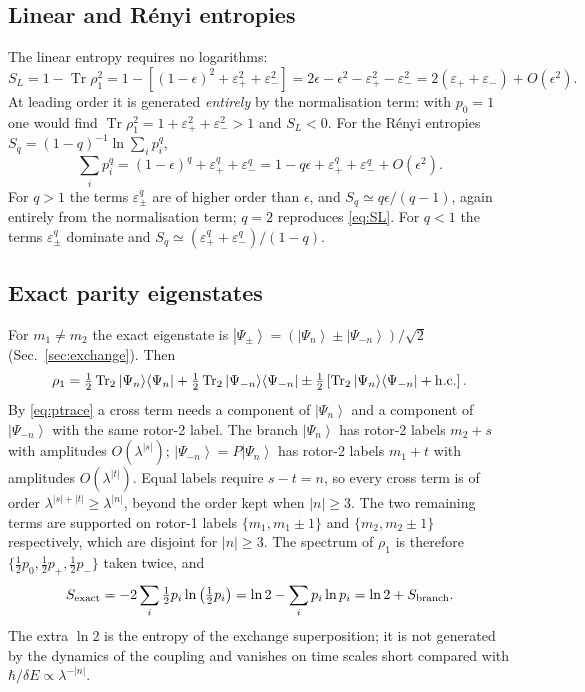 \documentclass[preprint,12pt]{elsarticle}
\newcommand{\Tr}{\operatorname{Tr}}
\newcommand{\ket}[1]{\left|#1\right\rangle}
\newcommand{\ketbra}[2]{\left|#1\right\rangle\!\left\langle#2\right|}
\newcommand{\epsp}{\varepsilon_{+}}
\newcommand{\epsm}{\varepsilon_{-}}
\begin{document}
\subsection{Linear and R\'enyi entropies}

The linear entropy requires no logarithms:
\begin{equation}
S_{L}=1-\Tr\rho_{1}^{2}=1-\left[(1-\epsilon)^{2}+\epsp^{2}+\epsm^{2}\right]
=2\epsilon-\epsilon^{2}-\epsp^{2}-\epsm^{2}=2\left(\epsp+\epsm\right)+O(\epsilon^{2}).
\label{eq:SL}
\end{equation}
At leading order it is generated \emph{entirely} by the normalisation term: with
$p_{0}=1$ one would find $\Tr\rho_{1}^{2}=1+\epsp^{2}+\epsm^{2}>1$ and
$S_{L}<0$. For the R\'enyi entropies
$S_{q}=(1-q)^{-1}\ln\sum_{i}p_{i}^{q}$,
\begin{equation}
\sum_{i}p_{i}^{q}=(1-\epsilon)^{q}+\epsp^{q}+\epsm^{q}
=1-q\epsilon+\epsp^{q}+\epsm^{q}+O(\epsilon^{2}).
\end{equation}
For $q>1$ the terms $\varepsilon_{\pm}^{q}$ are of higher order than $\epsilon$,
and $S_{q}\simeq q\epsilon/(q-1)$, again entirely from the normalisation
term; $q=2$ reproduces \eqref{eq:SL}. For $q<1$ the terms
$\varepsilon_{\pm}^{q}$ dominate and $S_{q}\simeq(\epsp^{q}+\epsm^{q})/(1-q)$.

\subsection{Exact parity eigenstates}
\label{sec:ln2}

For $m_{1}\neq m_{2}$ the exact eigenstate is
$\ket{\Psi_{\pm}}=(\ket{\Psi_{n}}\pm\ket{\Psi_{-n}})/\sqrt2$
(Sec.~\ref{sec:exchange}). Then
\begin{equation}
\rho_{1}=\tfrac12\Tr_{2}\ketbra{\Psi_{n}}{\Psi_{n}}
+\tfrac12\Tr_{2}\ketbra{\Psi_{-n}}{\Psi_{-n}}
\pm\tfrac12\left[\Tr_{2}\ketbra{\Psi_{n}}{\Psi_{-n}}+{\rm h.c.}\right].
\end{equation}
By \eqref{eq:ptrace} a cross term needs a component of $\ket{\Psi_{n}}$ and a
component of $\ket{\Psi_{-n}}$ with the same rotor-2 label. The branch
$\ket{\Psi_{n}}$ has rotor-2 labels $m_{2}+s$ with amplitudes $O(\lambda^{|s|})$;
$\ket{\Psi_{-n}}=P\ket{\Psi_{n}}$ has rotor-2 labels $m_{1}+t$ with amplitudes
$O(\lambda^{|t|})$. Equal labels require $s-t=n$, so every cross term is of
order $\lambda^{|s|+|t|}\ge\lambda^{|n|}$, beyond the order kept when
$|n|\ge3$. The two remaining terms are supported on rotor-1 labels
$\{m_{1},m_{1}\pm1\}$ and $\{m_{2},m_{2}\pm1\}$ respectively, which are disjoint
for $|n|\ge3$. The spectrum of $\rho_{1}$ is therefore
$\{\tfrac12p_{0},\tfrac12p_{+},\tfrac12p_{-}\}$ taken twice, and
\begin{equation}
S_{\rm exact}=-2\sum_{i}\tfrac12p_{i}\ln\left(\tfrac12p_{i}\right)
=\ln2-\sum_{i}p_{i}\ln p_{i}=\ln2+S_{\rm branch}.
\label{eq:ln2}
\end{equation}
The extra $\ln2$ is the entropy of the exchange superposition; it is not
generated by the dynamics of the coupling and vanishes on time scales short
compared with $\hbar/\delta E\propto\lambda^{-|n|}$.
\end{document}
